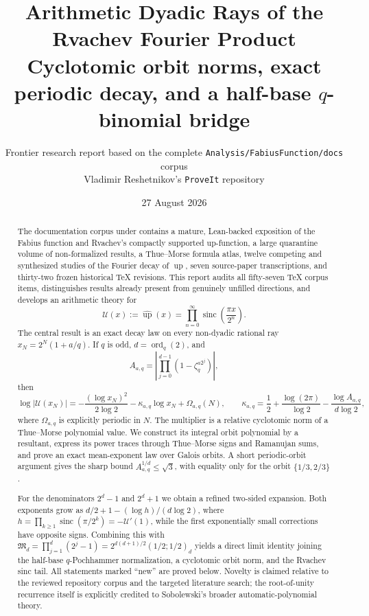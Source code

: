 \documentclass[11pt,oneside]{article}
\title{\bfseries Arithmetic Dyadic Rays of the Rvachev Fourier Product\\[0.35em]
\large Cyclotomic orbit norms, exact periodic decay, and a half-base $q$-binomial bridge}
\author{Frontier research report based on the complete \texttt{Analysis/FabiusFunction/docs} corpus\\
\small Vladimir Reshetnikov's \texttt{ProveIt} repository}
\date{27 August 2026}
\theoremstyle{definition}
\theoremstyle{remark}
\newcommand{\Up}{\operatorname{up}}
\newcommand{\sinc}{\operatorname{sinc}}
\newcommand{\ord}{\operatorname{ord}}
\begin{document}
\maketitle

\begin{abstract}
The documentation corpus under  contains a mature,
Lean-backed exposition of the Fabius function and Rvachev's compactly supported
up-function, a large quarantine volume of non-formalized results, a Thue--Morse
formula atlas, twelve competing and synthesized studies of the Fourier decay of
$\Up$, seven source-paper transcriptions, and thirty-two frozen historical TeX
revisions. This report audits all fifty-seven TeX corpus items, distinguishes
results already present from genuinely unfilled directions, and develops an
arithmetic theory for
\[
 \mathscr U(x):=\widehat{\Up}(x)
 =\prod_{n=0}^{\infty}\sinc\!\left(\frac{\pi x}{2^n}\right).
\]
The central result is an exact decay law on every non-dyadic rational ray
$x_N=2^N(1+a/q)$. If $q$ is odd, $d=\ord_q(2)$, and
\[
 A_{a,q}=\left|\prod_{j=0}^{d-1}(1-\zeta_q^{a2^j})\right|,
\]
then
\[
 \log|\mathscr U(x_N)|
 =-\frac{(\log x_N)^2}{2\log2}-\kappa_{a,q}\log x_N+\Omega_{a,q}(N),
 \qquad
 \kappa_{a,q}=\frac12+\frac{\log(2\pi)}{\log2}-\frac{\log A_{a,q}}{d\log2},
\]
where $\Omega_{a,q}$ is explicitly periodic in $N$. The multiplier is a relative
cyclotomic norm of a Thue--Morse polynomial value. We construct its integral orbit
polynomial by a resultant, express its power traces through Thue--Morse signs and
Ramanujan sums, and prove an exact mean-exponent law over Galois orbits. A short
periodic-orbit argument gives the sharp bound $A_{a,q}^{1/d}\le\sqrt3$, with equality
only for the orbit $\{1/3,2/3\}$.

For the denominators $2^d-1$ and $2^d+1$ we obtain a refined two-sided expansion.
Both exponents grow as $d/2+1-(\log h)/(d\log2)$, where
$h=\prod_{k\ge1}\sinc(\pi/2^k)=-\mathscr U'(1)$, while the first exponentially small
corrections have opposite signs. Combining this with
$\mathfrak M_d=\prod_{j=1}^d(2^j-1)=2^{d(d+1)/2}(1/2;1/2)_d$ yields a direct limit
identity joining the half-base $q$-Pochhammer normalization, a cyclotomic orbit
norm, and the Rvachev sinc tail. All statements marked ``new'' are proved below.
Novelty is claimed relative to the reviewed repository corpus and the targeted
literature search; the root-of-unity recurrence itself is explicitly credited to
Sobolewski's broader automatic-polynomial theory.
\end{abstract}
\end{document}
